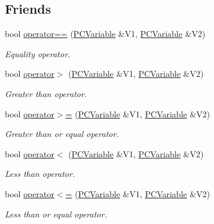 \subsection*{Friends}
\begin{DoxyCompactItemize}
\item 
bool \hyperlink{classpc__emulator_1_1PCVariable_a4bf53edd51b34ef0cea20954a63b25b3}{operator==} (\hyperlink{classpc__emulator_1_1PCVariable}{P\+C\+Variable} \&V1, \hyperlink{classpc__emulator_1_1PCVariable}{P\+C\+Variable} \&V2)
\begin{DoxyCompactList}\small\item\em Equality operator. \end{DoxyCompactList}\item 
bool \hyperlink{classpc__emulator_1_1PCVariable_a1c8e162bb6c99341885cfc69b69e6dd6}{operator$>$} (\hyperlink{classpc__emulator_1_1PCVariable}{P\+C\+Variable} \&V1, \hyperlink{classpc__emulator_1_1PCVariable}{P\+C\+Variable} \&V2)
\begin{DoxyCompactList}\small\item\em Greater than operator. \end{DoxyCompactList}\item 
bool \hyperlink{classpc__emulator_1_1PCVariable_a3fb4ab46eb9d012efbe9ba1127720769}{operator$>$=} (\hyperlink{classpc__emulator_1_1PCVariable}{P\+C\+Variable} \&V1, \hyperlink{classpc__emulator_1_1PCVariable}{P\+C\+Variable} \&V2)
\begin{DoxyCompactList}\small\item\em Greater than or equal operator. \end{DoxyCompactList}\item 
bool \hyperlink{classpc__emulator_1_1PCVariable_a956e9e39a54e37a37bead9f837142a4d}{operator$<$} (\hyperlink{classpc__emulator_1_1PCVariable}{P\+C\+Variable} \&V1, \hyperlink{classpc__emulator_1_1PCVariable}{P\+C\+Variable} \&V2)
\begin{DoxyCompactList}\small\item\em Less than operator. \end{DoxyCompactList}\item 
bool \hyperlink{classpc__emulator_1_1PCVariable_a397b2de8149fff0ab06bb128ccc99176}{operator$<$=} (\hyperlink{classpc__emulator_1_1PCVariable}{P\+C\+Variable} \&V1, \hyperlink{classpc__emulator_1_1PCVariable}{P\+C\+Variable} \&V2)
\begin{DoxyCompactList}\small\item\em Less than or equal operator. \end{DoxyCompactList}\end{DoxyCompactItemize}


